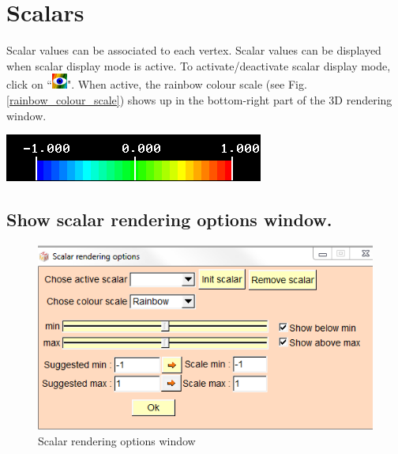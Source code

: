 
\chapter{Scalars}
\minitoc 

\noindent
\begin{minipage}{0.5\textwidth}
Scalar values can be associated to each vertex. Scalar values can be displayed when scalar display mode is active. To activate/deactivate scalar display mode, click on ``\includegraphics[scale=0.7]{images/pixmap/show_color_scale.png}".
When active, the rainbow colour scale (see Fig. \ref{rainbow_colour_scale}) shows up in the
bottom-right part of the 3D rendering window.
\end{minipage}    
\begin{minipage}{0.5\textwidth}\centering
  \includegraphics[scale=0.5]{images/Scalars_renreding/Colour_scale.png}
\label{rainbow_colour_scale}
 \end{minipage} 
\noindent


\section{Show scalar rendering options window.}


\begin{figure}
  \centering
  \includegraphics[scale=0.5]{images/Scalars_renreding/Colour_scale_rendering_window.png}
\caption{Scalar rendering options window}	
\label{Scalar_rendering_options_window}
 \end{figure}


